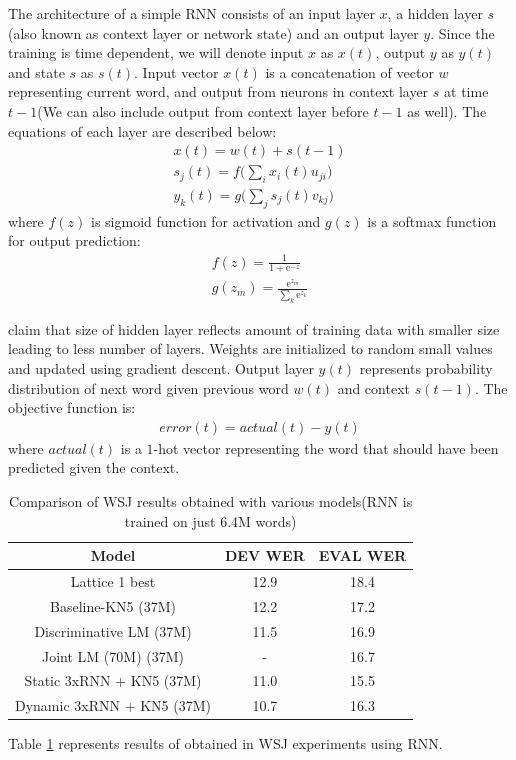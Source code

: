 \documentclass[11pt,a4paper]{article}
\begin{document}
The architecture of a simple RNN consists of an input layer $x$, a hidden layer $s$(also known as context layer or network state) and an output layer $y$. Since the training is time dependent, we will denote input $x$ as $x(t)$, output $y$ as $y(t)$ and state $s$ as $s(t)$. Input vector $x(t)$ is a concatenation of vector $w$ representing current word, and output from neurons in context layer $s$ at time $t-1$(We can also include output from context layer before $t-1$ as well). The equations of each layer are described below:
\begin{align}
x(t) = w(t) + s(t-1) \\
s_j(t) = f\bigg(\sum_{i}x_i(t)u_{ji}\bigg) \\
y_k(t) = g\bigg(\sum_{j}s_j(t)v_{kj}\bigg)
\end{align}
where $f(z)$ is sigmoid function for activation and $g(z)$ is a softmax function for output prediction:
\begin{align}
f(z) = \frac{1}{1+\mathrm{e}^{-z}} \\
g(z_m) = \frac{\mathrm{e}^{z_m}}{\sum_{k}\mathrm{e}^{z_k}}
\end{align}

\cite{Mikolov:10} claim that size of hidden layer reflects amount of training data with smaller size leading to less number of layers. Weights are initialized to random small values and updated using gradient descent. Output layer $y(t)$ represents probability distribution of next word given previous word $w(t)$ and context $s(t-1)$. The objective function is:
\begin{align}
error(t) =  actual(t) - y(t)
\end{align}
where $actual(t)$ is a $1$-hot vector representing the word that should have been predicted given the context.
\begin {table}[h!]
\centering
\small
\begin{tabular}{ |c|c|c| }
\hline
Model & DEV WER & EVAL WER \\ \hline
Lattice 1 best & 12.9 & 18.4 \\ 
Baseline-KN5 (37M) & 12.2 & 17.2 \\
Discriminative LM (37M) & 11.5 & 16.9 \\
Joint LM (70M) (37M) & - & 16.7 \\ \hline
Static 3xRNN + KN5 (37M) & 11.0 & 15.5 \\
Dynamic 3xRNN + KN5 (37M) & 10.7 & 16.3 \\
\hline
\end{tabular}
\caption {Comparison of WSJ results obtained with various models(RNN is trained on just 6.4M words)}
\label{table:rnn}
\end{table}
Table \ref{table:rnn} represents results of \cite{Mikolov:10} obtained in WSJ experiments using RNN.\\
\end{document}
